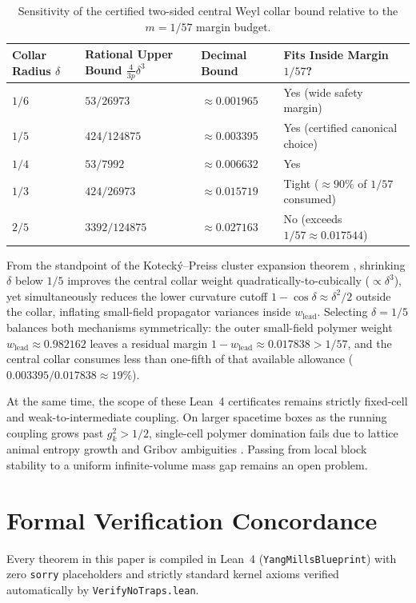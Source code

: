\documentclass[11pt,a4paper]{article}
\begin{document}
\begin{table}[ht]
\centering
\small
\begin{tabular}{@{}llll@{}}
\toprule
Collar Radius $\delta$ & Rational Upper Bound $\frac{4}{3p}\delta^3$ & Decimal Bound & Fits Inside Margin $1/57$? \\
\midrule
$1/6$ & $53 / 26973$ & $\approx 0.001965$ & Yes (wide safety margin) \\
$1/5$ & $424 / 124875$ & $\approx 0.003395$ & Yes (certified canonical choice) \\
$1/4$ & $53 / 7992$ & $\approx 0.006632$ & Yes \\
$1/3$ & $424 / 26973$ & $\approx 0.015719$ & Tight ($\approx 90\%$ of $1/57$ consumed) \\
$2/5$ & $3392 / 124875$ & $\approx 0.027163$ & No (exceeds $1/57 \approx 0.017544$) \\
\bottomrule
\end{tabular}
\caption{Sensitivity of the certified two-sided central Weyl collar bound relative to the $m = 1/57$ margin budget.}
\label{tab:collar-sensitivity}
\end{table}

From the standpoint of the Koteck\'y--Preiss cluster expansion theorem \cite{KoteckyPreiss1986}, shrinking $\delta$ below $1/5$ improves the central collar weight quadratically-to-cubically ($\propto \delta^3$), yet simultaneously reduces the lower curvature cutoff $1 - \cos\delta \approx \delta^2 / 2$ outside the collar, inflating small-field propagator variances inside $w_{\mathrm{lead}}$. Selecting $\delta = 1/5$ balances both mechanisms symmetrically: the outer small-field polymer weight $w_{\mathrm{lead}} \approx 0.982162$ leaves a residual margin $1 - w_{\mathrm{lead}} \approx 0.017838 > 1/57$, and the central collar consumes less than one-fifth of that available allowance ($0.003395 / 0.017838 \approx 19\%$).

At the same time, the scope of these Lean~4 certificates remains strictly fixed-cell and weak-to-intermediate coupling. On larger spacetime boxes as the running coupling grows past $g_k^2 > 1/2$, single-cell polymer domination fails due to lattice animal entropy growth and Gribov ambiguities \cite{Gribov1978,Balaban1989CMP122}. Passing from local block stability to a uniform infinite-volume mass gap remains an open problem.

\section{Formal Verification Concordance}
Every theorem in this paper is compiled in Lean~4 (\texttt{YangMillsBlueprint}) with zero \texttt{sorry} placeholders and strictly standard kernel axioms verified automatically by \texttt{VerifyNoTraps.lean}.
\end{document}
